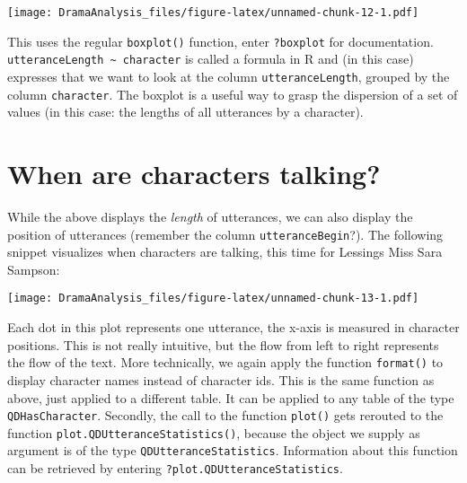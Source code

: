 \documentclass[]{book}
\newenvironment{Shaded}{\begin{snugshade}}{\end{snugshade}}
\newcommand{\CommentTok}[1]{\textcolor[rgb]{0.56,0.35,0.01}{\textit{#1}}}
\newcommand{\DataTypeTok}[1]{\textcolor[rgb]{0.13,0.29,0.53}{#1}}
\newcommand{\DecValTok}[1]{\textcolor[rgb]{0.00,0.00,0.81}{#1}}
\newcommand{\FloatTok}[1]{\textcolor[rgb]{0.00,0.00,0.81}{#1}}
\newcommand{\KeywordTok}[1]{\textcolor[rgb]{0.13,0.29,0.53}{\textbf{#1}}}
\newcommand{\NormalTok}[1]{#1}
\newcommand{\OperatorTok}[1]{\textcolor[rgb]{0.81,0.36,0.00}{\textbf{#1}}}
\newcommand{\StringTok}[1]{\textcolor[rgb]{0.31,0.60,0.02}{#1}}
\begin{document}
\texttt{[image: DramaAnalysis\_files/figure-latex/unnamed-chunk-12-1.pdf]}

This uses the regular \texttt{boxplot()} function, enter \texttt{?boxplot} for documentation. \texttt{utteranceLength\ \textasciitilde{}\ character} is called a formula in R and (in this case) expresses that we want to look at the column \texttt{utteranceLength}, grouped by the column \texttt{character}. The boxplot is a useful way to grasp the dispersion of a set of values (in this case: the lengths of all utterances by a character).

\hypertarget{when-are-characters-talking}{%
\section{When are characters talking?}\label{when-are-characters-talking}}

While the above displays the \emph{length} of utterances, we can also display the position of utterances (remember the column \texttt{utteranceBegin}?). The following snippet visualizes when characters are talking, this time for Lessings Miss Sara Sampson:

\begin{Shaded}
\end{Shaded}

\texttt{[image: DramaAnalysis\_files/figure-latex/unnamed-chunk-13-1.pdf]}

Each dot in this plot represents one utterance, the x-axis is measured in character positions. This is not really intuitive, but the flow from left to right represents the flow of the text. More technically, we again apply the function \texttt{format()} to display character names instead of character ids. This is the same function as above, just applied to a different table. It can be applied to any table of the type \texttt{QDHasCharacter}. Secondly, the call to the function \texttt{plot()} gets rerouted to the function \texttt{plot.QDUtteranceStatistics()}, because the object we supply as argument is of the type \texttt{QDUtteranceStatistics}. Information about this function can be retrieved by entering \texttt{?plot.QDUtteranceStatistics}.
\end{document}
